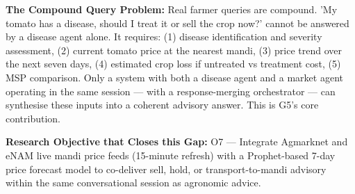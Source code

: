 \documentclass[12pt,a4paper]{article}
\begin{document}
\noindent\textbf{The Compound Query Problem:}
Real farmer queries are compound. 'My tomato has a disease, should I treat it or sell the crop now?' cannot be answered by a disease agent alone. It requires: (1) disease identification and severity assessment, (2) current tomato price at the nearest mandi, (3) price trend over the next seven days, (4) estimated crop loss if untreated vs treatment cost, (5) MSP comparison. Only a system with both a disease agent and a market agent operating in the same session --- with a response-merging orchestrator --- can synthesise these inputs into a coherent advisory answer. This is G5's core contribution.

\noindent\textbf{Research Objective that Closes this Gap:}
O7 --- Integrate Agmarknet and eNAM live mandi price feeds (15-minute refresh) with a Prophet-based 7-day price forecast model to co-deliver sell, hold, or transport-to-mandi advisory within the same conversational session as agronomic advice.
\end{document}
